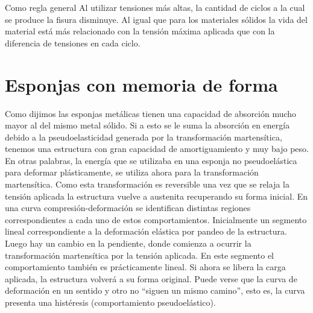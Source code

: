 \documentclass[a4paper,12pt,fleqn,twoside,openany]{book}
\begin{document}
Como regla general \cite{design} Al utilizar tensiones más altas, la cantidad de ciclos a la cual se produce la fisura disminuye. Al igual que para los 
materiales sólidos la vida del material está más relacionado con la tensión máxima aplicada que con la diferencia de tensiones en cada ciclo. 












\section{Esponjas con memoria de forma }
\label{sec:SMF}

Como dijimos las esponjas metálicas tienen una capacidad de absorción mucho mayor al del mismo metal sólido. Si a esto se le suma la absorción en energía 
debido a la pseudoelasticidad generada por la transformación martensítica, tenemos una estructura con gran capacidad de amortiguamiento y muy bajo 
peso. En otras palabras, la energía que se utilizaba en una esponja no pseudoelástica para deformar plásticamente, se utiliza ahora para la transformación
martensítica. Como esta transformación es reversible una vez que se relaja la tensión aplicada la estructura vuelve a austenita recuperando su forma 
inicial. En una curva compresión-deformación se identifican distintas regiones correspondientes a cada uno de estos comportamientos. Inicialmente un 
segmento lineal correspondiente a la deformación elástica por pandeo de la estructura. Luego hay un cambio en la pendiente, donde comienza a ocurrir 
la transformación martensítica por la tensión aplicada. En este segmento el comportamiento también es prácticamente lineal. Si ahora se libera la carga 
aplicada, la estructura volverá a su forma original. Puede verse que la curva de deformación en un sentido y otro no “siguen un mismo camino”, esto es, 
la curva presenta una histéresis (comportamiento pseudoelástico). 
\end{document}
